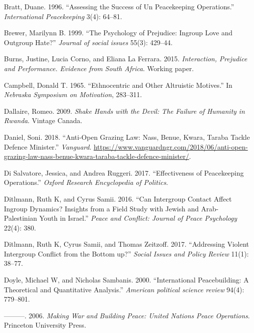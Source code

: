 \documentclass[11pt]{article}
\begin{document}
\hypertarget{ref-bratt1996assessing}{}
Bratt, Duane. 1996. ``Assessing the Success of Un Peacekeeping
Operations.'' \emph{International Peacekeeping} 3(4): 64--81.

\hypertarget{ref-brewer1999ingroupOutgroup}{}
Brewer, Marilynn B. 1999. ``The Psychology of Prejudice: Ingroup Love
and Outgroup Hate?'' \emph{Journal of social issues} 55(3): 429--44.

\hypertarget{ref-burns2015interaction}{}
Burns, Justine, Lucia Corno, and Eliana La Ferrara. 2015.
\emph{Interaction, Prejudice and Performance. Evidence from South
Africa}. Working paper.

\hypertarget{ref-campbell1965ethno}{}
Campbell, Donald T. 1965. ``Ethnocentric and Other Altruistic Motives.''
In \emph{Nebraska Symposium on Motivation}, 283--311.

\hypertarget{ref-dallaire2009shake}{}
Dallaire, Romeo. 2009. \emph{Shake Hands with the Devil: The Failure of
Humanity in Rwanda}. Vintage Canada.

\hypertarget{ref-daniel2018anti}{}
Daniel, Soni. 2018. ``Anti-Open Grazing Law: Nass, Benue, Kwara, Taraba
Tackle Defence Minister.'' \emph{Vanguard}.
\url{https://www.vanguardngr.com/2018/06/anti-open-grazing-law-nass-benue-kwara-taraba-tackle-defence-minister/}.

\hypertarget{ref-di2017effectiveness}{}
Di Salvatore, Jessica, and Andrea Ruggeri. 2017. ``Effectiveness of
Peacekeeping Operations.'' \emph{Oxford Research Encyclopedia of
Politics}.

\hypertarget{ref-ditlmann2016can}{}
Ditlmann, Ruth K, and Cyrus Samii. 2016. ``Can Intergroup Contact Affect
Ingroup Dynamics? Insights from a Field Study with Jewish and
Arab-Palestinian Youth in Israel.'' \emph{Peace and Conflict: Journal of
Peace Psychology} 22(4): 380.

\hypertarget{ref-ditlmann2017addressing}{}
Ditlmann, Ruth K, Cyrus Samii, and Thomas Zeitzoff. 2017. ``Addressing
Violent Intergroup Conflict from the Bottom up?'' \emph{Social Issues
and Policy Review} 11(1): 38--77.

\hypertarget{ref-doyle2000international}{}
Doyle, Michael W, and Nicholas Sambanis. 2000. ``International
Peacebuilding: A Theoretical and Quantitative Analysis.'' \emph{American
political science review} 94(4): 779--801.

\hypertarget{ref-doyle2006making}{}
---------. 2006. \emph{Making War and Building Peace: United Nations
Peace Operations}. Princeton University Press.
\end{document}
